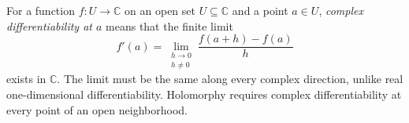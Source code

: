 
For a function $f:U\to\mathbb C$ on an open set $U\subseteq\mathbb C$ and a point $a\in U$, \emph{complex differentiability at $a$} means that the finite limit
\[
f'(a)=\lim_{\substack{h\to0\\h\ne0}}\frac{f(a+h)-f(a)}{h}
\]
exists in $\mathbb C$. The limit must be the same along every complex direction, unlike real one-dimensional differentiability. Holomorphy requires complex differentiability at every point of an open neighborhood.
